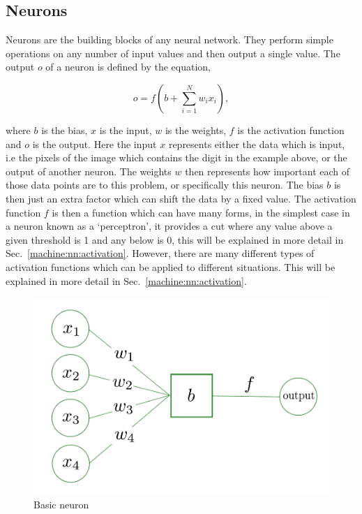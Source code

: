 \subsection{\label{machine:nn:neuron}Neurons}

Neurons are the building blocks of any neural network.
They perform simple operations on any number of input values and then output a single value.
The output $o$ of a neuron is defined by the equation,

\begin{equation}
    o = f\left(b + \sum_{i=1}^{N} w_i x_i  \right),
    \label{machine:nn:neuron:equation}
\end{equation}

where $b$ is the bias, $x$ is the input, $w$ is the weights, $f$ is the activation function and $o$ is the output.
Here the input $x$ represents either the data which is input, i.e the pixels of the image which contains the digit in the example above, or the output of another neuron.
The weights $w$ then represents how important each of those data points are to this problem, or specifically this neuron. 
The bias $b$ is then just an extra factor which can shift the data by a fixed value.
The activation function $f$ is then a function which can have many forms, in the simplest case in a neuron known as a `perceptron', it provides a cut where any value above a given threshold is 1 and any below is 0, this will be explained in more detail in Sec.~\ref{machine:nn:activation}. 
However, there are many different types of activation functions which can be applied to different situations.
This will be explained in more detail in Sec.~\ref{machine:nn:activation}.

\begin{figure}[h]
    \centering
    \includegraphics[width=0.6\columnwidth]{C4_cnn/neuron.pdf}
    \caption{Basic neuron}
    \label{machine:nn:neuron:plot}
\end{figure}

